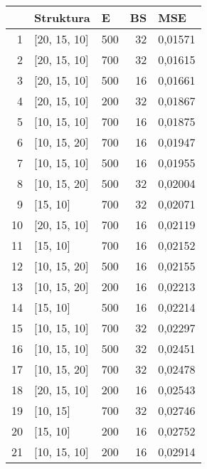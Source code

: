 \begin{table}[htbp]
  \centering
  {
  \begin{tabular}{r|l|r|r|r}
    \toprule
          & Struktura & \multicolumn{1}{l|}{E} & \multicolumn{1}{l|}{BS} & \multicolumn{1}{l}{MSE} \\
    \midrule
    \midrule
    1     &  {[20, 15, 10]} & 500   & 32    & 0,01571 \\
    \midrule
    2     &  {[20, 15, 10]} & 700   & 32    & 0,01615 \\
    \midrule
    3     &  {[20, 15, 10]} & 500   & 16    & 0,01661 \\
    \midrule
    4     &  {[20, 15, 10]} & 200   & 32    & 0,01867 \\
    \midrule
    5     &  {[10, 15, 10]} & 700   & 16    & 0,01875 \\
    \midrule
    6     &  {[10, 15, 20]} & 700   & 16    & 0,01947 \\
    \midrule
    7     &  {[10, 15, 10]} & 500   & 16    & 0,01955 \\
    \midrule
    8     &  {[10, 15, 20]} & 500   & 32    & 0,02004 \\
    \midrule
    9     &  {[15, 10]} & 700   & 32    & 0,02071 \\
    \midrule
    10    &  {[20, 15, 10]} & 700   & 16    & 0,02119 \\
    \midrule
    11    &  {[15, 10]} & 700   & 16    & 0,02152 \\
    \midrule
    12    &  {[10, 15, 20]} & 500   & 16    & 0,02155 \\
    \midrule
    13    &  {[10, 15, 20]} & 200   & 16    & 0,02213 \\
    \midrule
    14    &  {[15, 10]} & 500   & 16    & 0,02214 \\
    \midrule
    15    &  {[10, 15, 10]} & 700   & 32    & 0,02297 \\
      \midrule
      16    &  {[10, 15, 10]} & 500   & 32    & 0,02451 \\
      \midrule
      17    &  {[10, 15, 20]} & 700   & 32    & 0,02478 \\
      \midrule
      18    &  {[20, 15, 10]} & 200   & 16    & 0,02543 \\
      \midrule
      19    &  {[10, 15]} & 700   & 32    & 0,02746 \\
      \midrule
      20    &  {[15, 10]} & 200   & 16    & 0,02752 \\
      \midrule
      21    &  {[10, 15, 10]} & 200   & 16    & 0,02914 \\

\end{tabular}}
\end{table}
